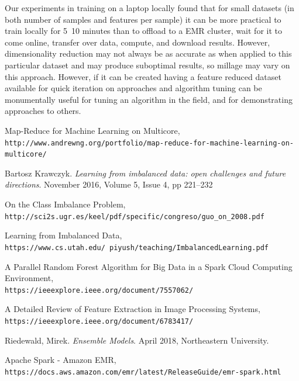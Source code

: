 \documentclass{neu_handout}
\begin{document}
Our experiments in training on a laptop locally found that for small datasets (in both number of samples and features per sample) it can be more practical to train locally for 5~10 minutes than to offload to a EMR cluster, wait for it to come online, transfer over data, compute, and download results. However, dimensionality reduction may not always be as accurate as when applied to this particular dataset and may produce suboptimal results, so millage may vary on this approach. However, if it can be created having a feature reduced dataset available for quick iteration on approaches and algorithm tuning can be monumentally useful for tuning an algorithm in the field, and for demonstrating approaches to others.


\newpage

\begin{thebibliography}{9}

Map-Reduce for Machine Learning on Multicore,
\\\texttt{http://www.andrewng.org/portfolio/map-reduce-for-machine-learning-on-multicore/}

 Bartosz Krawczyk. \textsl{Learning from imbalanced data: open challenges and future directions}. November 2016, Volume 5, Issue 4, pp 221–232

On the Class Imbalance Problem,
\\\texttt{http://sci2s.ugr.es/keel/pdf/specific/congreso/guo\_on\_2008.pdf}

Learning from Imbalanced Data,
\\\texttt{https://www.cs.utah.edu/~piyush/teaching/ImbalancedLearning.pdf}

A Parallel Random Forest Algorithm for Big Data in a Spark Cloud Computing Environment,
\\\texttt{https://ieeexplore.ieee.org/document/7557062/}

A Detailed Review of Feature Extraction in Image Processing Systems,
\\\texttt{https://ieeexplore.ieee.org/document/6783417/}

 Riedewald, Mirek. \textsl{Ensemble Models}. April 2018, Northeastern University.

Apache Spark - Amazon EMR,
\\\texttt{https://docs.aws.amazon.com/emr/latest/ReleaseGuide/emr-spark.html}


\end{thebibliography}
\end{document}
